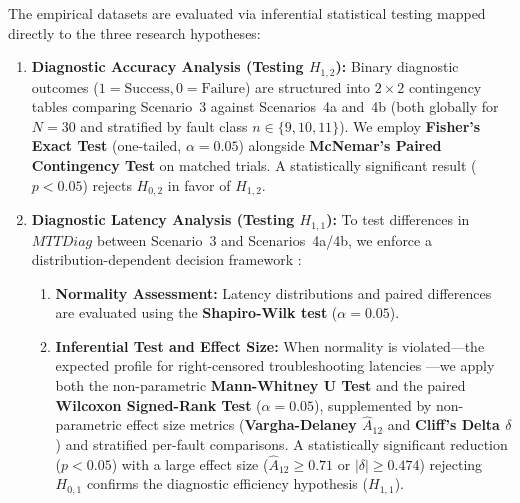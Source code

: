 The empirical datasets are evaluated via inferential statistical testing mapped directly to the three research hypotheses:

\begin{enumerate}
    \item \textbf{Diagnostic Accuracy Analysis (Testing $H_{1,2}$):} Binary diagnostic outcomes ($1 = \text{Success}, 0 = \text{Failure}$) are structured into $2\times2$ contingency tables comparing Scenario~3 against Scenarios~4a and~4b (both globally for $N=30$ and stratified by fault class $n \in \{9, 10, 11\}$). We employ \textbf{Fisher's Exact Test} (one-tailed, $\alpha = 0.05$) \cite{agresti_2007} alongside \textbf{McNemar's Paired Contingency Test} on matched trials. A statistically significant result ($p < 0.05$) rejects $H_{0,2}$ in favor of $H_{1,2}$.

    \item \textbf{Diagnostic Latency Analysis (Testing $H_{1,1}$):} To test differences in $MTTDiag$ between Scenario~3 and Scenarios~4a/4b, we enforce a distribution-dependent decision framework \cite{wohlin_2012}:
    \begin{enumerate}
        \item \textbf{Normality Assessment:} Latency distributions and paired differences are evaluated using the \textbf{Shapiro-Wilk test} ($\alpha = 0.05$).
        \item \textbf{Inferential Test and Effect Size:} When normality is violated---the expected profile for right-censored troubleshooting latencies \cite{barata_2026}---we apply both the non-parametric \textbf{Mann-Whitney U Test} and the paired \textbf{Wilcoxon Signed-Rank Test} ($\alpha = 0.05$), supplemented by non-parametric effect size metrics (\textbf{Vargha-Delaney $\hat{A}_{12}$} and \textbf{Cliff's Delta $\delta$}) and stratified per-fault comparisons. A statistically significant reduction ($p < 0.05$) with a large effect size ($\hat{A}_{12} \ge 0.71$ or $|\delta| \ge 0.474$) rejecting $H_{0,1}$ confirms the diagnostic efficiency hypothesis ($H_{1,1}$).
    \end{enumerate}


\end{enumerate}
